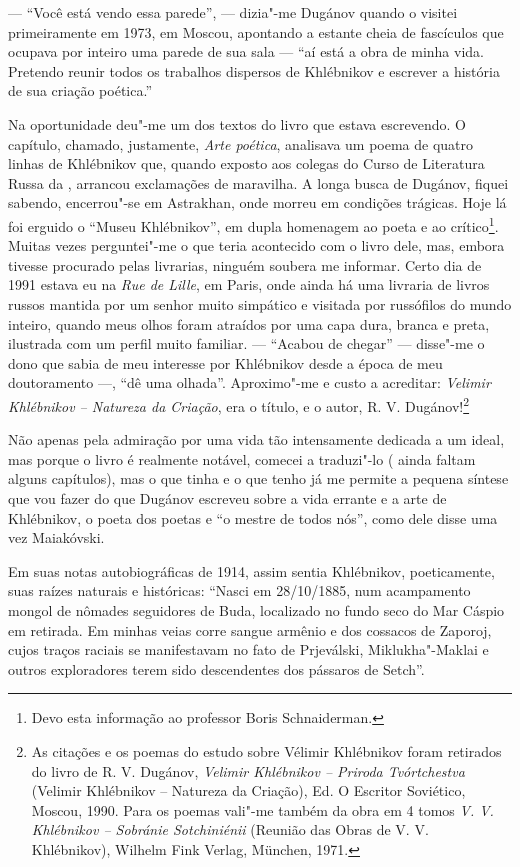 --- ``Você está vendo essa parede'', --- dizia"-me Dugánov quando o visitei
primeiramente em 1973, em Moscou, apontando a estante cheia de fascículos que
ocupava por inteiro uma parede de sua sala --- ``aí está a obra
de minha vida. Pretendo reunir todos os trabalhos dispersos de Khlébnikov
e escrever a história de sua criação poética.''

Na oportunidade deu"-me um dos textos do livro que estava escrevendo. O
capítulo, chamado, justamente, \emph{Arte poética}, analisava um poema
de quatro linhas de Khlébnikov que, quando exposto aos colegas do Curso
de Literatura Russa da , arrancou exclamações de maravilha. A longa
busca de Dugánov, fiquei sabendo, encerrou"-se em Astrakhan, onde
morreu em condições trágicas. Hoje lá foi erguido o ``Museu
Khlébnikov'', em dupla homenagem ao poeta e ao crítico\footnote{Devo
  esta informação ao professor Boris Schnaiderman.}. Muitas vezes
perguntei"-me o que teria acontecido com o livro dele, mas, embora
tivesse procurado pelas livrarias, ninguém soubera me informar. Certo
dia de 1991 estava eu na \emph{Rue de Lille}, em Paris, onde ainda há
uma livraria de livros russos mantida por um senhor muito simpático e
visitada por russófilos do mundo inteiro, quando meus olhos foram
atraídos por uma capa dura, branca e preta, ilustrada com um perfil muito
familiar. --- ``Acabou de chegar'' --- disse"-me o dono que sabia de meu
interesse por Khlébnikov desde a época de meu doutoramento ---, ``dê uma
olhada''. Aproximo"-me e custo a acreditar: \emph{Velimir Khlébnikov -- Natureza da Criação}, era o título, e o autor, R. V.
Dugánov!\footnote{As citações e os poemas do estudo sobre Vélimir
  Khlébnikov foram retirados do livro de R. V. Dugánov, \emph{Velimir
  Khlébnikov -- Priroda Tvórtchestva} (Velimir Khlébnikov -- Natureza da
Criação), Ed. O Escritor Soviético, Moscou, 1990. Para os poemas
  vali"-me também da obra em 4 tomos \emph{V. V. Khlébnikov --
Sobránie Sotchiniénii} (Reunião das Obras de V. V. Khlébnikov),
  Wilhelm Fink Verlag, München, 1971.}

Não apenas pela admiração por uma vida tão intensamente dedicada a um
ideal, mas porque o livro é realmente notável, comecei a traduzi"-lo (
ainda faltam alguns capítulos), mas o que tinha e o que tenho já me
permite a pequena síntese que vou fazer do que Dugánov escreveu sobre a
vida errante e a arte de Khlébnikov, o poeta dos poetas e ``o mestre de
todos nós'', como dele disse uma vez Maiakóvski.

Em suas notas autobiográficas de 1914, assim sentia Khlébnikov,
poeticamente, suas raízes naturais e históricas: ``Nasci em 28/10/1885,
num acampamento mongol de nômades seguidores de Buda, localizado no
fundo seco do Mar Cáspio em retirada. Em minhas veias corre sangue
armênio e dos cossacos de Zaporoj, cujos traços raciais se manifestavam
no fato de Prjeválski, Miklukha"-Maklai e outros exploradores terem sido
descendentes dos pássaros de Setch''.


